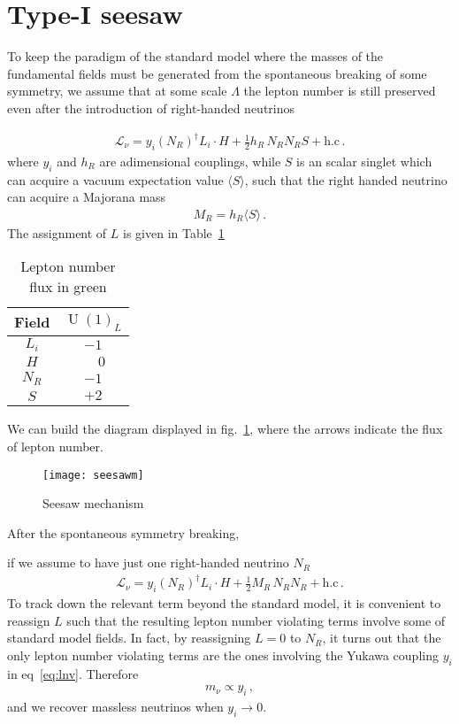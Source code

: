 \section{Type-I seesaw}

To keep the paradigm of the standard model where the masses of the fundamental fields must be generated from the spontaneous breaking of some symmetry, we assume that at some scale $\Lambda$ the lepton number is still preserved even after the introduction of right-handed neutrinos
\begin{frame}
\begin{align}
  \mathcal{L}_{\nu}=y_{i} \left( N_R \right)^{\dagger} L_i\cdot  H   
  +\tfrac{1}{2} h_R\, N_R  N_R S + \text{h.c}\,.
\end{align}
where $y_i$ and $h_R$ are adimensional couplings, while $S$ is an scalar singlet which can acquire a vacuum expectation value $\langle S \rangle$, such that the right handed neutrino can acquire a Majorana mass
\begin{align}
  M_R=h_R \langle S \rangle\,.
\end{align}
The assignment of $L$ is given in Table~\ref{tab:Lassign}
\begin{table}
  \centering
  \begin{tabular}{c|c}
    Field& $\operatorname{U}(1)_L$\\ \hline
    $L_i$& $-1$ \\
    $H$& $\phantom{-}0$ \\
    $N_{R}$& $-1$ \\
    $S$&$+2$
  \end{tabular}
  \caption{Lepton number flux in green }
  \label{tab:Lassign}
\end{table}

We can build the diagram displayed in fig.~\ref{fig:lnv}, where the arrows indicate the flux of lepton number. 

\begin{figure}
  \centering
  \texttt{[image: seesawm]}
  \caption{Seesaw mechanism}
  \label{fig:lnv}
\end{figure}

\end{frame}
After the spontaneous symmetry breaking,
\begin{frame}
if we assume to have just one right-handed neutrino $N_R$ 
\begin{align}
  \label{eq:lnv}
  \mathcal{L}_{\nu}=y_{i} \left( N_R \right)^{\dagger} L_i\cdot  H   
  +\tfrac{1}{2} M_R\, N_R  N_R + \text{h.c}\,.
\end{align}
To track down the relevant term beyond the standard model, it is convenient to reassign $L$ such that the resulting lepton number violating terms involve some of standard model fields. In fact, by reassigning $L=0$ to $N_R$, it turns out that the only lepton number violating terms are the ones involving the Yukawa coupling $y_i$ in eq~\eqref{eq:lnv}. Therefore
\begin{align}
  m_{\nu}\propto y_i\,,
\end{align}
and we recover massless neutrinos when $y_i\to 0$.

\end{frame}
